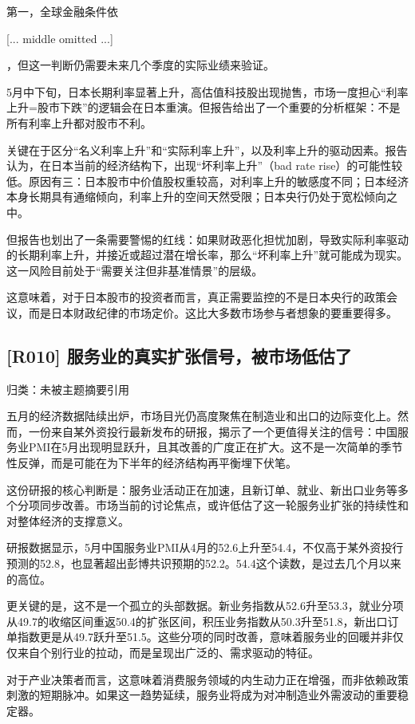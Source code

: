 \documentclass[11pt]{ctexart}
\begin{document}
第一，全球金融条件依

[... middle omitted ...]

，但这一判断仍需要未来几个季度的实际业绩来验证。

5月中下旬，日本长期利率显著上升，高估值科技股出现抛售，市场一度担心“利率上升=股市下跌”的逻辑会在日本重演。但报告给出了一个重要的分析框架：不是所有利率上升都对股市不利。

关键在于区分“名义利率上升”和“实际利率上升”，以及利率上升的驱动因素。报告认为，在日本当前的经济结构下，出现“坏利率上升”（bad rate rise）的可能性较低。原因有三：日本股市中价值股权重较高，对利率上升的敏感度不同；日本经济本身长期具有通缩倾向，利率上升的空间天然受限；日本央行仍处于宽松倾向之中。

但报告也划出了一条需要警惕的红线：如果财政恶化担忧加剧，导致实际利率驱动的长期利率上升，并接近或超过潜在增长率，那么“坏利率上升”就可能成为现实。这一风险目前处于“需要关注但非基准情景”的层级。

这意味着，对于日本股市的投资者而言，真正需要监控的不是日本央行的政策会议，而是日本财政纪律的市场定价。这比大多数市场参与者想象的要重要得多。

\subsection{[R010] 服务业的真实扩张信号，被市场低估了}
{\small\color{refgray}归类：未被主题摘要引用}

五月的经济数据陆续出炉，市场目光仍高度聚焦在制造业和出口的边际变化上。然而，一份来自某外资投行最新发布的研报，揭示了一个更值得关注的信号：中国服务业PMI在5月出现明显跃升，且其改善的广度正在扩大。这不是一次简单的季节性反弹，而是可能在为下半年的经济结构再平衡埋下伏笔。

这份研报的核心判断是：服务业活动正在加速，且新订单、就业、新出口业务等多个分项同步改善。市场当前的讨论焦点，或许低估了这一轮服务业扩张的持续性和对整体经济的支撑意义。

研报数据显示，5月中国服务业PMI从4月的52.6上升至54.4，不仅高于某外资投行预测的52.8，也显著超出彭博共识预期的52.2。54.4这个读数，是过去几个月以来的高位。

更关键的是，这不是一个孤立的头部数据。新业务指数从52.6升至53.3，就业分项从49.7的收缩区间重返50.4的扩张区间，积压业务指数从50.3升至51.8，新出口订单指数更是从49.7跃升至51.5。这些分项的同时改善，意味着服务业的回暖并非仅仅来自个别行业的拉动，而是呈现出广泛的、需求驱动的特征。

对于产业决策者而言，这意味着消费服务领域的内生动力正在增强，而非依赖政策刺激的短期脉冲。如果这一趋势延续，服务业将成为对冲制造业外需波动的重要稳定器。
\end{document}
